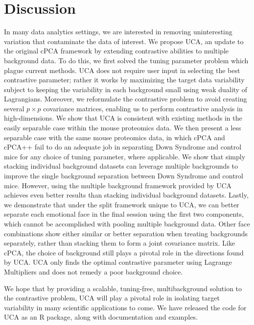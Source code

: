 \documentclass[12pt]{article}
\begin{document}
\section{Discussion}
In many data analytics settings, we are interested in removing uninteresting variation that contaminate the data of interest.
We propose UCA, an update to the original cPCA framework by extending contrastive abilities to multiple background data. To do this, we first solved the tuning parameter problem which plague current methods. UCA does not require user input in selecting the best contrastive parameter; rather it works by maximizing the target data variability subject to keeping the variability in each background small using weak duality of Lagrangians. 
Moreover, we reformulate the contrastive problem to avoid creating several $p \times p$ covariance matrices, enabling us to perform contrastive analysis in high-dimensions.
We show that UCA is consistent with existing methods in the easily separable case within the mouse proteomics data. We then present a less separable case with the same mouse proteomics data, in which cPCA and cPCA++ fail to do an adequate job in separating Down Syndrome and control mice for any choice of tuning parameter, where applicable.
We show that simply stacking individual background datasets can leverage multiple backgrounds to improve the single background separation between Down Syndrome and control mice.
However, using the multiple background framework provided by UCA achieves even better results than stacking individual background datasets. 
Lastly, we demonstrate that under the split framework unique to UCA, we can better separate each emotional face in the final session using the first two components, which cannot be accomplished with pooling multiple background data.  Other face combinations show either similar or better separation when treating backgrounds separately, rather than stacking them to form a joint covariance matrix.
Like cPCA, the choice of background still plays a pivotal role in the directions found by UCA. UCA only finds the optimal contrastive parameter using Lagrange Multipliers and does not remedy a poor background choice.

We hope that by providing a scalable, tuning-free, multibackground solution to the contrastive problem, UCA will play a pivotal role in isolating target variability in many scientific applications to come. 
We have released the code for UCA as an R package, along with documentation and examples.

\end{document}
